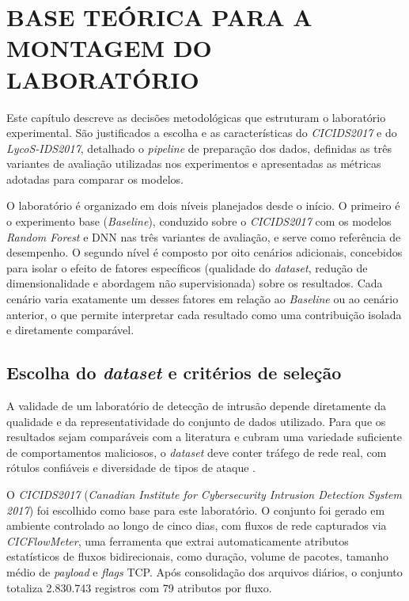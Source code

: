\chapter{BASE TEÓRICA PARA A MONTAGEM DO LABORATÓRIO}

Este capítulo descreve as decisões metodológicas que estruturam o laboratório experimental. São justificados a escolha e as características do \textit{CICIDS2017} e do \textit{LycoS-IDS2017}, detalhado o \textit{pipeline} de preparação dos dados, definidas as três variantes de avaliação utilizadas nos experimentos e apresentadas as métricas adotadas para comparar os modelos.

O laboratório é organizado em dois níveis planejados desde o início. O primeiro é o experimento base (\textit{Baseline}), conduzido sobre o \textit{CICIDS2017} com os modelos \textit{Random Forest} e DNN nas três variantes de avaliação, e serve como referência de desempenho. O segundo nível é composto por oito cenários adicionais, concebidos para isolar o efeito de fatores específicos (qualidade do \textit{dataset}, redução de dimensionalidade e abordagem não supervisionada) sobre os resultados. Cada cenário varia exatamente um desses fatores em relação ao \textit{Baseline} ou ao cenário anterior, o que permite interpretar cada resultado como uma contribuição isolada e diretamente comparável.

\section{Escolha do \textit{dataset} e critérios de seleção}

A validade de um laboratório de detecção de intrusão depende diretamente da qualidade e da representatividade do conjunto de dados utilizado. Para que os resultados sejam comparáveis com a literatura e cubram uma variedade suficiente de comportamentos maliciosos, o \textit{dataset} deve conter tráfego de rede real, com rótulos confiáveis e diversidade de tipos de ataque \cite{neto_gomes}.

O \textit{CICIDS2017} (\textit{Canadian Institute for Cybersecurity Intrusion Detection System 2017}) foi escolhido como base para este laboratório. O conjunto foi gerado em ambiente controlado ao longo de cinco dias, com fluxos de rede capturados via \textit{CICFlowMeter}, uma ferramenta que extrai automaticamente atributos estatísticos de fluxos bidirecionais, como duração, volume de pacotes, tamanho médio de \textit{payload} e \textit{flags} TCP. Após consolidação dos arquivos diários, o conjunto totaliza 2.830.743 registros com 79 atributos por fluxo.

